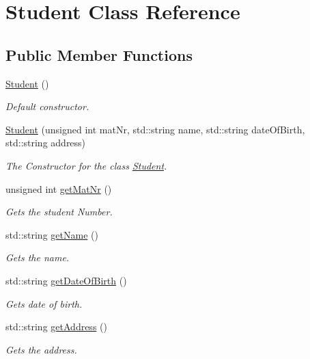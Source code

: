 \hypertarget{class_student}{}\section{Student Class Reference}
\label{class_student}
\subsection*{Public Member Functions}
\begin{DoxyCompactItemize}
\item 
\mbox{\label{class_student_af9168cedbfa5565cf0b20c1a9d3f5c9d}} 
\hyperlink{class_student_af9168cedbfa5565cf0b20c1a9d3f5c9d}{Student} ()
\begin{DoxyCompactList}\small\item\em Default constructor. \end{DoxyCompactList}\item 
\hyperlink{class_student_a6c25e4c1ba2564591573597a6c9ecca0}{Student} (unsigned int mat\+Nr, std\+::string name, std\+::string date\+Of\+Birth, std\+::string address)
\begin{DoxyCompactList}\small\item\em The Constructor for the class \hyperlink{class_student}{Student}. \end{DoxyCompactList}\item 
unsigned int \hyperlink{class_student_a2f996798d6c9b904e3abf902f68d3c0b}{get\+Mat\+Nr} ()
\begin{DoxyCompactList}\small\item\em Gets the student Number. \end{DoxyCompactList}\item 
std\+::string \hyperlink{class_student_a729c900a0e95c46f90668f527a72ad34}{get\+Name} ()
\begin{DoxyCompactList}\small\item\em Gets the name. \end{DoxyCompactList}\item 
std\+::string \hyperlink{class_student_a9c46502480d94c46865eee494f96bfe0}{get\+Date\+Of\+Birth} ()
\begin{DoxyCompactList}\small\item\em Gets date of birth. \end{DoxyCompactList}\item 
std\+::string \hyperlink{class_student_a960945bd258db14e42973ad04150ebf5}{get\+Address} ()
\begin{DoxyCompactList}\small\item\em Gets the address. \end{DoxyCompactList}\item 

\end{DoxyCompactItemize}

